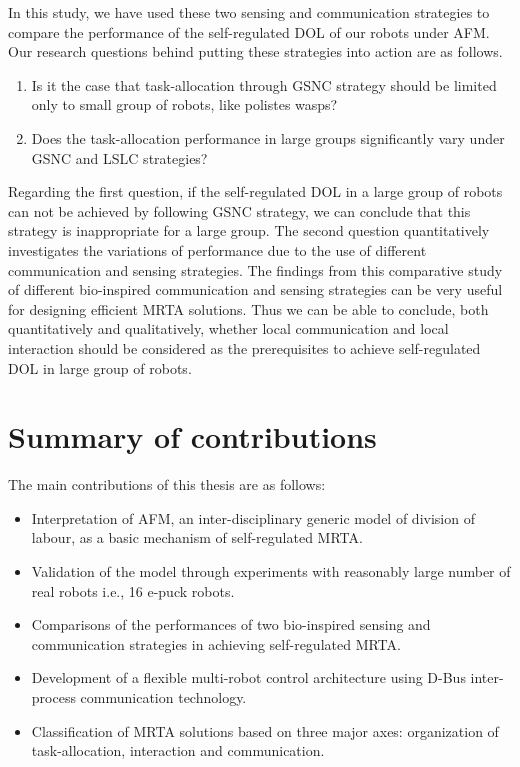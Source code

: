 In this study, we have used these two sensing and communication strategies to compare the performance of the self-regulated DOL of our robots under AFM. %
Our research questions behind putting these strategies into action are as follows.
\begin{enumerate}
\item Is it the case that task-allocation through GSNC strategy should be limited only to small group of robots, like polistes wasps?
\item 
Does the task-allocation performance in large groups significantly vary under GSNC and LSLC strategies?
\end{enumerate}
Regarding the first question, if the self-regulated DOL in a large group of robots can not be achieved by following GSNC strategy, we can conclude that this strategy is inappropriate for a large group. The second question quantitatively investigates the variations of performance due to the use of different communication and sensing strategies. The findings from this comparative study of different bio-inspired communication and sensing strategies can be very useful for designing efficient MRTA solutions. Thus we can be able to conclude, both quantitatively and qualitatively, whether local communication and local interaction should be considered as the prerequisites to achieve self-regulated DOL in large group of robots.
\section{Summary of contributions}
The main contributions of this thesis are as follows:
\begin{itemize}
\item Interpretation of AFM, an inter-disciplinary generic model of division of labour, as a basic mechanism of self-regulated MRTA.
\item Validation of the model through experiments with reasonably large number of real robots i.e., 16 e-puck robots.
\item Comparisons of the performances of two bio-inspired sensing and communication strategies in achieving self-regulated MRTA.
\item Development of a flexible multi-robot control architecture using D-Bus inter-process communication technology.
\item Classification of MRTA solutions based on three major axes: organization of task-allocation, interaction and communication.
\end{itemize}
